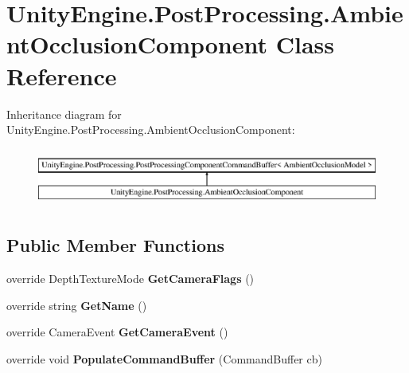 \hypertarget{class_unity_engine_1_1_post_processing_1_1_ambient_occlusion_component}{}\section{Unity\+Engine.\+Post\+Processing.\+Ambient\+Occlusion\+Component Class Reference}
\label{class_unity_engine_1_1_post_processing_1_1_ambient_occlusion_component}
Inheritance diagram for Unity\+Engine.\+Post\+Processing.\+Ambient\+Occlusion\+Component\+:\begin{figure}[H]
\begin{center}
\leavevmode
\includegraphics[height=1.921098cm]{class_unity_engine_1_1_post_processing_1_1_ambient_occlusion_component}
\end{center}
\end{figure}
\subsection*{Public Member Functions}
\begin{DoxyCompactItemize}
\item 
\mbox{\label{class_unity_engine_1_1_post_processing_1_1_ambient_occlusion_component_ad75fa4a0898e2d84ffaa842433864c79}} 
override Depth\+Texture\+Mode {\bfseries Get\+Camera\+Flags} ()
\item 
\mbox{\label{class_unity_engine_1_1_post_processing_1_1_ambient_occlusion_component_a912e17f44f887c19511e31cb4211551c}} 
override string {\bfseries Get\+Name} ()
\item 
\mbox{\label{class_unity_engine_1_1_post_processing_1_1_ambient_occlusion_component_a40c2e1160a63cb63a910d9e232515001}} 
override Camera\+Event {\bfseries Get\+Camera\+Event} ()
\item 
\mbox{\label{class_unity_engine_1_1_post_processing_1_1_ambient_occlusion_component_a5f64f7638a6a441cf4bdaeb54dbf1601}} 
override void {\bfseries Populate\+Command\+Buffer} (Command\+Buffer cb)
\end{DoxyCompactItemize}
